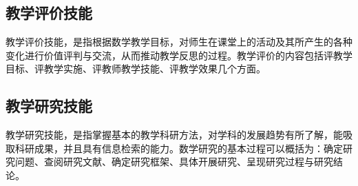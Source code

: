 \subsection{教学评价技能}

教学评价技能，是指根据数学教学目标，对师生在课堂上的活动及其所产生的各种变化进行价值评判与交流，从而推动教学反思的过程。教学评价的内容包括评教学目标、评教学实施、评教师教学技能、评教学效果几个方面。


\subsection{教学研究技能}

教学研究技能，是指掌握基本的教学科研方法，对学科的发展趋势有所了解，能吸取科研成果，并且具有信息检索的能力。数学研究的基本过程可以概括为：确定研究问题、查阅研究文献、确定研究框架、具体开展研究、呈现研究过程与研究结论。